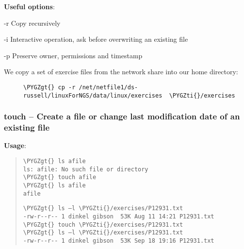 \documentclass[a4paper,11pt,english]{sphinxmanual}
\def\PYGZgt{\char`\>}
\def\PYGZti{\char`\~}
\begin{document}
\textbf{Useful options}:
\begin{optionlist}{3cm}
\item [-r]  
Copy recursively
\item [-i]  
Interactive operation, ask before overwriting an existing file
\item [-p]  
Preserve owner, permissions and timestamp
\end{optionlist}
\begin{description}
\item[{We copy a set of exercise files from the network share into our home directory:}] \leavevmode
\begin{Verbatim}[frame=single, rulecolor=\color{lightgray}, fontfamily=courier, commandchars=\\\{\}]
\PYGZgt{} cp -r /net/netfile1/ds-russell/linuxForNGS/data/linux/exercises  \PYGZti{}/exercises
\end{Verbatim}

\end{description}


\subsubsection{touch – Create a file or change last modification date of an existing file}
\label{introduction:touch-create-a-file-or-change-last-modification-date-of-an-existing-file}
\textbf{Usage}:  
\begin{quote}

\begin{Verbatim}[frame=single, rulecolor=\color{lightgray}, fontfamily=courier, commandchars=\\\{\}]
\PYGZgt{} ls afile
ls: afile: No such file or directory
\PYGZgt{} touch afile
\PYGZgt{} ls afile
afile
\end{Verbatim}

\begin{Verbatim}[frame=single, rulecolor=\color{lightgray}, fontfamily=courier, commandchars=\\\{\}]
\PYGZgt{} ls –l \PYGZti{}/exercises/P12931.txt
-rw-r--r-- 1 dinkel gibson  53K Aug 11 14:21 P12931.txt
\PYGZgt{} touch \PYGZti{}/exercises/P12931.txt
\PYGZgt{} ls –l \PYGZti{}/exercises/P12931.txt
-rw-r--r-- 1 dinkel gibson  53K Sep 18 19:16 P12931.txt
\end{Verbatim}
\end{quote}
\end{document}
